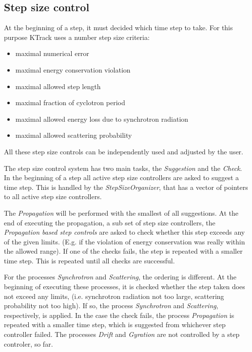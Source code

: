 \subsection{Step size control}
\label{stepsizes}
At the beginning of a step, it must decided which time step to take. For this purpose KTrack uses a number step size criteria:
\begin {itemize}
    \item maximal numerical error
    \item maximal energy conservation violation
    \item maximal allowed step length
    \item maximal fraction of cyclotron period
    \item maximal allowed energy loss due to synchrotron radiation
    \item maximal allowed scattering probability
\end {itemize}
All these step size controls can be independently used and adjusted by the user. 

The step size control system has two main tasks, the \textit{Suggestion} and the \textit{Check}. In the beginning of a step all active step size controllers are asked to suggest a time step. This is handled by the \textit{StepSizeOrganizer}, that has a vector of pointers to all active step size controllers.

The \textit{Propagation} will be performed with the smallest of all suggestions. At the end of executing the propagation, a sub set of step size controllers, the \textit{Propagation based step controls} are asked to check whether this step exceeds any of the given limits. (E.g. if the violation of energy conservation was really within the allowed range). If one of the checks fails, the step is repeated with a smaller time step. This is repeated until all checks are successful. 

For the processes \textit{Synchrotron} and \textit{Scattering}, the ordering is different. At the beginning of executing these processes, it is checked whether the step taken does not exceed any limits, (i.e. synchrotron radiation not too large, scattering probability not too high). If so, the process \textit{Synchrotron} and \textit{Scattering}, respectively, is applied. In the case the check fails, the process \textit{Propagation} is repeated with a smaller time step, which is suggested from whichever step controller failed. The processes \textit{Drift} and \textit{Gyration} are not controlled by a step controler, so far.

